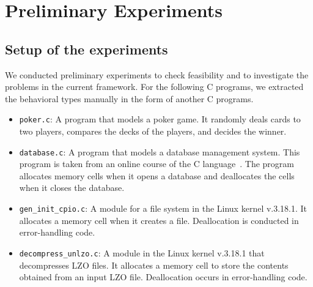 \section{Preliminary Experiments}
\label{sec:experiment}


\subsection{Setup of the experiments}

We conducted preliminary experiments to check feasibility and to
investigate the problems in the current framework.  For the following
C programs, we extracted the behavioral types manually in the form of
another C programs.
\begin{itemize}
\item \texttt{poker.c}: A program that models a poker game.  It
  randomly deals cards to two players, compares the decks of the
  players, and decides the winner.
\item \texttt{database.c}: A program that models a database management
  system.  This program is taken from an online course of the C
  language~\cite{lch}.  The program allocates memory cells when it
  opens a database and deallocates the cells when it closes the
  database.
\item \texttt{gen\_init\_cpio.c}: A module for a file system in the
  Linux kernel v.3.18.1.  It allocates a memory cell when it creates a
  file.  Deallocation is conducted in error-handling code.
\item \texttt{decompress\_unlzo.c}: A module in the Linux kernel
  v.3.18.1 that decompresses LZO files.  It allocates a memory cell to
  store the contents obtained from an input LZO file.  Deallocation
  occurs in error-handling code.
\end{itemize}


